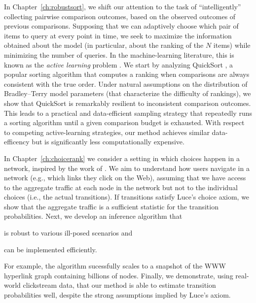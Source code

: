 In Chapter~\ref{ch:robustsort}, we shift our attention to the task of ``intelligently'' collecting pairwise comparison outcomes, based on the observed outcomes of previous comparisons.
Supposing that we can adaptively choose which pair of items to query at every point in time, we seek to maximize the information obtained about the model (in particular, about the ranking of the $N$ items) while minimizing the number of queries.
In the machine-learning literature, this is known as the \emph{active learning} problem \citep{settles2012active}.
We start by analyzing QuickSort \citep{hoare1962quicksort}, a popular sorting algorithm that computes a ranking when comparisons are always consistent with the true order.
Under natural assumptions on the distribution of Bradley--Terry model parameters (that characterize the difficulty of rankings), we show that QuickSort is remarkably resilient to inconsistent comparison outcomes.
This leads to a practical and data-efficient sampling strategy that repeatedly runs a sorting algorithm until a given comparison budget is exhausted.
With respect to competing active-learning strategies, our method achieves similar data-efficency but is significantly less computationally expensive.

In Chapter~\ref{ch:choicerank} we consider a setting in which choices happen in a network, inspired by the work of \citet{kumar2015inverting}.
We aim to understand how users navigate in a network (e.g., which links they click on the Web), assuming that we have access to the aggregate traffic at each node in the network but not to the individual choices (i.e., the actual transitions).
If transitions satisfy Luce's choice axiom, we show that the aggregate traffic is a sufficient statistic for the transition probabilities.
Next, we develop an inference algorithm that
\begin{enuminline}
\item is robust to various ill-posed scenarios and
\item can be implemented efficiently.
\end{enuminline}
For example, the algorithm sucessfully scales to a snapshot of the WWW hyperlink graph containing billions of nodes.
Finally, we demonstrate, using real-world clickstream data, that our method is able to estimate transition probabilities well, despite the strong assumptions implied by Luce's axiom.

